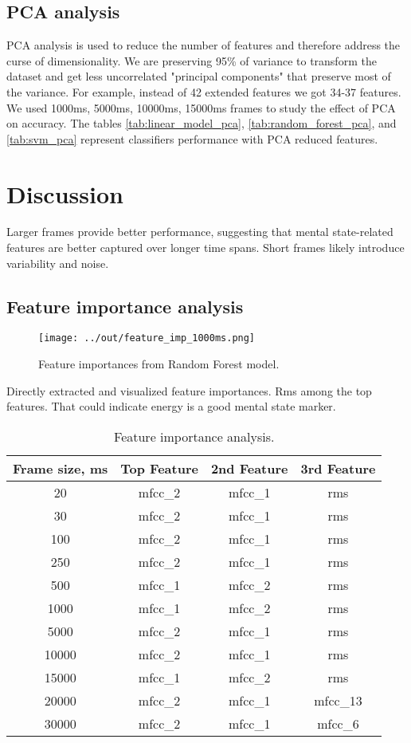 \documentclass[conference]{IEEEtran}
\begin{document}
\subsection{PCA analysis}
PCA analysis is used to reduce the number of features and therefore address the curse of dimensionality. 
We are preserving 95\% of variance to transform the dataset and get less uncorrelated "principal components" that preserve most of the variance.
For example, instead of 42 extended features we got 34-37 features.
We used 1000ms, 5000ms, 10000ms, 15000ms frames to study the effect of PCA on accuracy.
The tables \ref{tab:linear_model_pca}, \ref{tab:random_forest_pca}, and \ref{tab:svm_pca} represent classifiers performance with PCA reduced features.

\section{Discussion}
Larger frames provide better performance, suggesting that mental state-related features are better captured over longer time spans. 
Short frames likely introduce variability and noise.

\subsection{Feature importance analysis}
\begin{figure}[h]
    \centering
    \texttt{[image: ../out/feature\_imp\_1000ms.png]}
    \caption{Feature importances from Random Forest model.}
    \label{fig:feature_importance}
\end{figure}

Directly extracted and visualized feature importances. 
Rms among the top features. 
That could indicate energy is a good mental state marker.

\begin{table}[h]
\centering
\caption{Feature importance analysis.}
\begin{tabular}{|c|c|c|c|}
\hline
\textbf{Frame size, ms} & \textbf{Top Feature} & \textbf{2nd Feature} & \textbf{3rd Feature}\\
\hline
20 & mfcc\_2 & mfcc\_1 & rms \\
\hline
30 & mfcc\_2 & mfcc\_1 & rms \\
\hline
100 & mfcc\_2 & mfcc\_1 & rms \\
\hline
250 & mfcc\_2 & mfcc\_1 & rms \\
\hline
500 & mfcc\_1 & mfcc\_2 & rms \\
\hline
1000 & mfcc\_1 & mfcc\_2 & rms \\
\hline
5000 & mfcc\_2 & mfcc\_1 & rms \\
\hline
10000 & mfcc\_2 & mfcc\_1 & rms \\
\hline
15000 & mfcc\_1 & mfcc\_2 & rms \\
\hline
20000 & mfcc\_2 & mfcc\_1 & mfcc\_13 \\
\hline
30000 & mfcc\_2 & mfcc\_1 & mfcc\_6 \\
\hline
\end{tabular}
\label{tab:feaure_importance}
\end{table}
\end{document}
